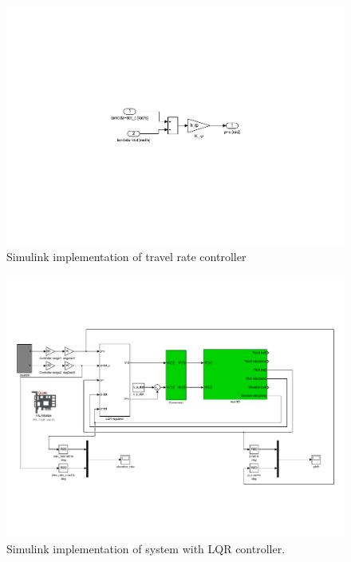 \begin{figure}[!htb]
	\centering
	\includegraphics[trim=250 250 250 250, clip, width=\textwidth]{simulink/P2p2_travel_reg.pdf}
	\caption{Simulink implementation of travel rate controller}
\label{fig:monoTravel}
\end{figure}

\begin{figure}[!htb]
	\centering
	\includegraphics[trim=0 100 0 100, clip, width=\textwidth]{simulink/P3p2.pdf}
	\caption{Simulink implementation of system with LQR controller.}
\label{fig:LQRSystem}
\end{figure}

